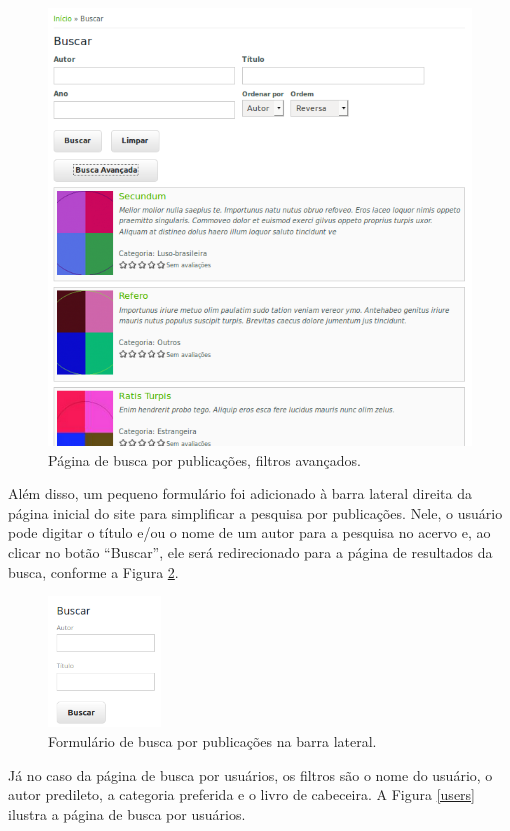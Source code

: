 \documentclass[a4paper]{article}
\begin{document}
\begin{figure}[pbth!]
\centering
\includegraphics[width=120mm]{img/browse-advanced.png}
\caption{Página de busca por publicações, filtros avançados.\label{advanced}}
\end{figure}

Além disso, um pequeno formulário foi adicionado à barra lateral direita da página inicial do site para simplificar a pesquisa por publicações. Nele, o usuário pode digitar o título e/ou o nome de um autor para a pesquisa no acervo e, ao clicar no botão “Buscar”, ele será redirecionado para a página de resultados da busca, conforme a Figura \ref{browse-sidebar}.

\begin{figure}[pbth!]
\centering
\includegraphics[width=30mm]{img/browse-sidebar.png}
\caption{Formulário de busca por publicações na barra lateral.\label{browse-sidebar}}
\end{figure}

Já no caso da página de busca por usuários, os filtros são o nome do usuário, o autor predileto, a categoria preferida e o livro de cabeceira. A Figura \ref{users} ilustra a página de busca por usuários.
\end{document}
